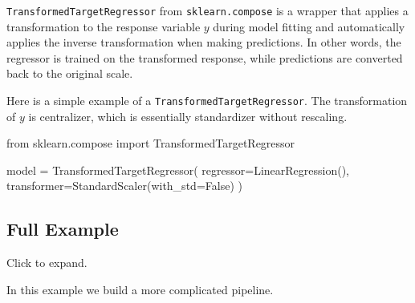 \documentclass[
  letterpaper,
  DIV=11,
  numbers=noendperiod]{scrreprt}
\newenvironment{Shaded}{\begin{snugshade}}{\end{snugshade}}
\newcommand{\ImportTok}[1]{\textcolor[rgb]{0.00,0.46,0.62}{#1}}
\newcommand{\NormalTok}[1]{\textcolor[rgb]{0.00,0.23,0.31}{#1}}
\newcommand{\OperatorTok}[1]{\textcolor[rgb]{0.37,0.37,0.37}{#1}}
\newcommand{\VariableTok}[1]{\textcolor[rgb]{0.07,0.07,0.07}{#1}}
\theoremstyle{definition}
\theoremstyle{definition}
\theoremstyle{plain}
\theoremstyle{plain}
\theoremstyle{remark}
\begin{document}
\texttt{TransformedTargetRegressor} from \texttt{sklearn.compose} is a
wrapper that applies a transformation to the response variable \(y\)
during model fitting and automatically applies the inverse
transformation when making predictions. In other words, the regressor is
trained on the transformed response, while predictions are converted
back to the original scale.

Here is a simple example of a \texttt{TransformedTargetRegressor}. The
transformation of \(y\) is centralizer, which is essentially
standardizer without rescaling.

\begin{Shaded}
\begin{Highlighting}[]
\ImportTok{from}\NormalTok{ sklearn.compose }\ImportTok{import}\NormalTok{ TransformedTargetRegressor}

\NormalTok{model }\OperatorTok{=}\NormalTok{ TransformedTargetRegressor(}
\NormalTok{    regressor}\OperatorTok{=}\NormalTok{LinearRegression(),}
\NormalTok{    transformer}\OperatorTok{=}\NormalTok{StandardScaler(with\_std}\OperatorTok{=}\VariableTok{False}\NormalTok{)}
\NormalTok{)}
\end{Highlighting}
\end{Shaded}

\subsection{Full Example}\label{full-example}

Click to expand.

In this example we build a more complicated pipeline.
\end{document}
